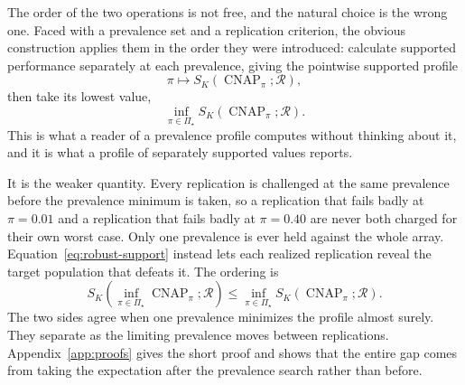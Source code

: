 \documentclass[11pt]{article}
\newcommand{\CNAP}{\operatorname{CNAP}}
\newcommand{\Regime}{\mathcal{R}}
\newcommand{\PSet}{\Pi_\star}
\theoremstyle{remark}
\begin{document}
The order of the two operations is not free, and the natural choice is the wrong one. Faced with a prevalence set and a replication criterion, the obvious construction applies them in the order they were introduced: calculate supported performance separately at each prevalence, giving the pointwise supported profile
\[
\pi
\longmapsto
S_K(\CNAP_\pi;\Regime),
\]
then take its lowest value,
\[
\inf_{\pi\in\PSet}S_K(\CNAP_\pi;\Regime).
\]
This is what a reader of a prevalence profile computes without thinking about it, and it is what a profile of separately supported values reports.

It is the weaker quantity. Every replication is challenged at the same prevalence before the prevalence minimum is taken, so a replication that fails badly at $\pi=0.01$ and a replication that fails badly at $\pi=0.40$ are never both charged for their own worst case. Only one prevalence is ever held against the whole array. Equation~\eqref{eq:robust-support} instead lets each realized replication reveal the target population that defeats it. The ordering is
\begin{equation}
S_K\left(
\inf_{\pi\in\PSet}\CNAP_\pi;
\Regime
\right)
\leq
\inf_{\pi\in\PSet}
S_K(\CNAP_\pi;\Regime).
\label{eq:strong-weak-order}
\end{equation}
The two sides agree when one prevalence minimizes the profile almost surely. They separate as the limiting prevalence moves between replications. Appendix~\ref{app:proofs} gives the short proof and shows that the entire gap comes from taking the expectation after the prevalence search rather than before.
\end{document}
